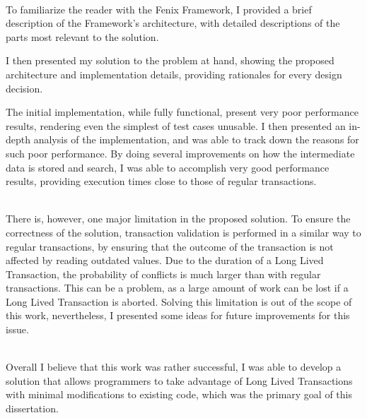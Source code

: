 \documentclass{llncs}
\begin{document}
~\\

To familiarize the reader with the Fenix Framework, I provided a brief
description of the Framework's architecture, with detailed
descriptions of the parts most relevant to the solution.

I then presented my solution to the problem at hand, showing the
proposed architecture and implementation details, providing rationales
for every design decision.

The initial implementation, while fully functional, present very poor
performance results, rendering even the simplest of test cases
unusable. I then presented an in-depth analysis of the implementation,
and was able to track down the reasons for such poor performance. By
doing several improvements on how the intermediate data is stored and
search, I was able to accomplish very good performance results,
providing execution times close to those of regular transactions.

~\\

There is, however, one major limitation in the proposed solution. To
ensure the correctness of the solution, transaction validation is
performed in a similar way to regular transactions, by ensuring that
the outcome of the transaction is not affected by reading outdated
values. Due to the duration of a Long Lived Transaction, the
probability of conflicts is much larger than with regular
transactions. This can be a problem, as a large amount of work can be
lost if a Long Lived Transaction is aborted. Solving this limitation
is out of the scope of this work, nevertheless, I presented some ideas
for future improvements for this issue.

~\\

Overall I believe that this work was rather successful, I was able to
develop a solution that allows programmers to take advantage of Long
Lived Transactions with minimal modifications to existing code, which
was the primary goal of this dissertation.


\clearpage  
\end{document}

